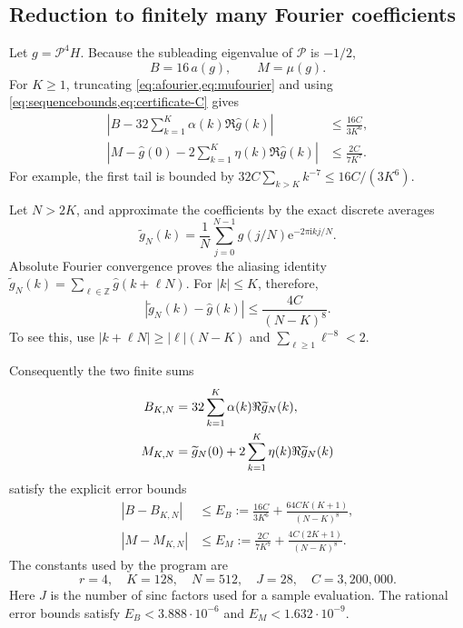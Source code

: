 \documentclass[11pt,a4paper]{article}
\theoremstyle{definition}
\theoremstyle{remark}
\newcommand{\Z}{\mathbb Z}
\newcommand{\ii}{\mathrm i}
\newcommand{\e}{\mathrm e}
\newcommand{\Pop}{\mathcal P}
\newcommand{\abs}[1]{\left|#1\right|}
\numberwithin{equation}{section}
\begin{document}
\subsection{Reduction to finitely many Fourier coefficients}
Let $g=\Pop^4H$. Because the subleading eigenvalue of $\Pop$ is $-1/2$,
\begin{equation}
 B=16\,a(g),\qquad M=\mu(g).
 \label{eq:smoothingconstants}
\end{equation}
For $K\ge1$, truncating \cref{eq:afourier,eq:mufourier} and using
\cref{eq:sequencebounds,eq:certificate-C} gives
\begin{align}
 \abs{B-32\sum_{k=1}^K\alpha(k)\Re\widehat g(k)}
 &\le\frac{16C}{3K^6},\label{eq:tail-a}\\
 \abs{M-\widehat g(0)-2\sum_{k=1}^K\eta(k)\Re\widehat g(k)}
 &\le\frac{2C}{7K^7}.
 \label{eq:tail-mu}
\end{align}
For example, the first tail is bounded by
$32C\sum_{k>K}k^{-7}\le16C/(3K^6)$.

Let $N>2K$, and approximate the coefficients by the exact discrete averages
\begin{equation}
 \widetilde g_N(k)=\frac1N\sum_{j=0}^{N-1}
            g(j/N)\e^{-2\pi\ii kj/N}.
 \label{eq:DFT}
\end{equation}
Absolute Fourier convergence proves the aliasing identity
$\widetilde g_N(k)=\sum_{\ell\in\Z}\widehat g(k+\ell N)$.
For $|k|\le K$, therefore,
\begin{equation}
 |\widetilde g_N(k)-\widehat g(k)|
 \le\frac{4C}{(N-K)^8}.
 \label{eq:alias}
\end{equation}
To see this, use $|k+\ell N|\ge|\ell|(N-K)$ and
$\sum_{\ell\ge1}\ell^{-8}<2$.

Consequently the two finite sums
\begin{align}
 B_{K,N}&=32\sum_{k=1}^K\alpha(k)\Re\widetilde g_N(k),\notag\\
 M_{K,N}&=\widetilde g_N(0)+2\sum_{k=1}^K
                         \eta(k)\Re\widetilde g_N(k)
 \label{eq:finite-estimates}
\end{align}
satisfy the explicit error bounds
\begin{align}
 |B-B_{K,N}|&\le E_B:=
 \frac{16C}{3K^6}+\frac{64CK(K+1)}{(N-K)^8},\label{eq:EB}\\
 |M-M_{K,N}|&\le E_M:=
 \frac{2C}{7K^7}+\frac{4C(2K+1)}{(N-K)^8}.
 \label{eq:EM}
\end{align}
The constants used by the program are
\begin{equation}
 r=4,\quad K=128,\quad N=512,\quad J=28,\quad C=3{,}200{,}000.
 \label{eq:certificateparameters}
\end{equation}
Here $J$ is the number of sinc factors used for a sample evaluation.
The rational error bounds satisfy
$E_B<3.888\cdot10^{-6}$ and $E_M<1.632\cdot10^{-9}$.
\end{document}
